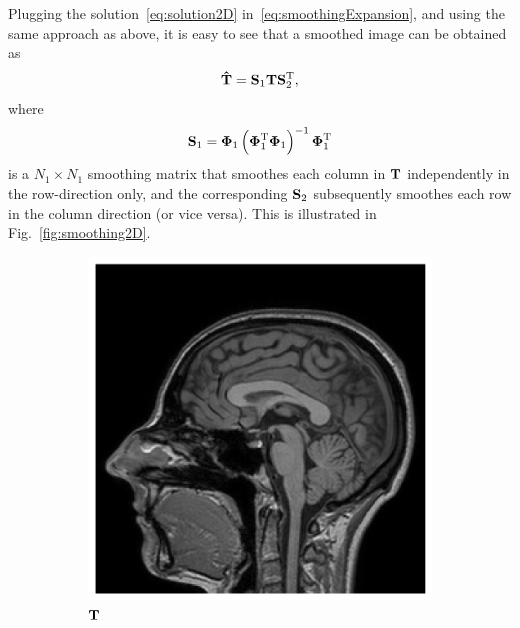\documentclass[10pt,twoside]{book}
\begin{document}
Plugging the solution~\eqref{eq:solution2D} 
in~\eqref{eq:smoothingExpansion}, and using the same approach as above,
it is easy to see that a smoothed image 
can be obtained as
$$
\mathbf{\hat{T}}
= \mathbf{S}_1 \mathbf{T} \mathbf{S}_2^\mathrm{T}, 
$$
where
$$
\mathbf{S}_1 = 
{\mbox{\boldmath {${\Phi}$}}}_1 
\left( {\mbox{\boldmath {${\Phi}$}}}_1^\mathrm{T} {\mbox{\boldmath {${\Phi}$}}}_1 \right)^{-1} 
{\mbox{\boldmath {${\Phi}$}}}_1^\mathrm{T}
$$
is a $N_1 \times N_1$ smoothing matrix that smoothes each column in $\mathbf{T}$ independently in the row-direction only, and 
the corresponding $\mathbf{S}_2$ subsequently smoothes each row in the column direction (or vice versa).
This is illustrated in Fig.~\ref{fig:smoothing2D}.


\begin{figure}
  \centering
  \begin{subfigure}{0.45\textwidth}
     \includegraphics[width=\textwidth]{smoothing2D_decimationFactor51_orig}
     \caption{$\mathbf{T}$}
  \end{subfigure}
  \hfill
  \begin{subfigure}{0.45\textwidth}

\end{subfigure}
\end{figure}
\end{document}
